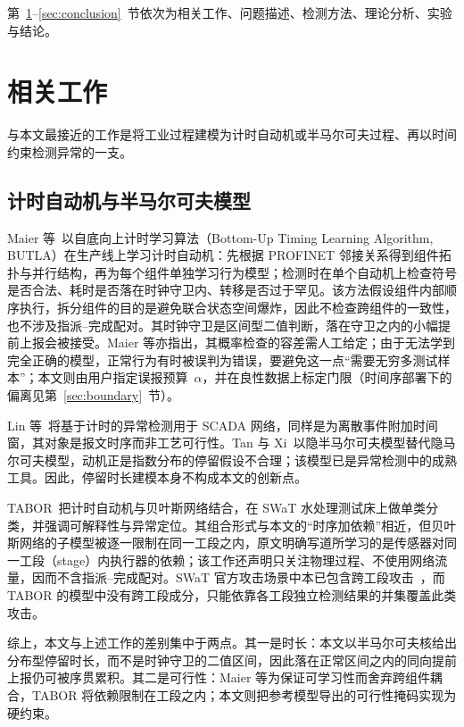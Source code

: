 \documentclass[manuscript,screen,review]{acmart}
\begin{document}
第~\ref{sec:related}--\ref{sec:conclusion}~节依次为相关工作、问题描述、检测方法、理论分析、实验与结论。

\section{相关工作}
\label{sec:related}

与本文最接近的工作是将工业过程建模为计时自动机或半马尔可夫过程、再以时间约束检测异常的一支。

\subsection{计时自动机与半马尔可夫模型}
\label{sec:rw_timed}

Maier 等~\cite{maier2011timed}以自底向上计时学习算法（Bottom-Up Timing Learning Algorithm, {BUTLA}）在生产线上学习计时自动机：先根据 {PROFINET} 邻接关系得到组件拓扑与并行结构，再为每个组件单独学习行为模型；检测时在单个自动机上检查符号是否合法、耗时是否落在时钟守卫内、转移是否过于罕见。该方法假设组件内部顺序执行，拆分组件的目的是避免联合状态空间爆炸，因此不检查跨组件的一致性，也不涉及指派--完成配对。其时钟守卫是区间型二值判断，落在守卫之内的小幅提前上报会被接受。Maier 等亦指出，其概率检查的容差需人工给定；由于无法学到完全正确的模型，正常行为有时被误判为错误，要避免这一点``需要无穷多测试样本''；本文则由用户指定误报预算~$\alpha$，并在良性数据上标定门限（时间序部署下的偏离见第~\ref{sec:boundary}~节）。

Lin 等~\cite{lin2018timing}将基于计时的异常检测用于 {SCADA} 网络，同样是为离散事件附加时间窗，其对象是报文时序而非工艺可行性。Tan 与 Xi~\cite{tan2008hsmm}以隐半马尔可夫模型替代隐马尔可夫模型，动机正是指数分布的停留假设不合理；该模型已是异常检测中的成熟工具。因此，停留时长建模本身不构成本文的创新点。

TABOR~\cite{lin2018tabor}把计时自动机与贝叶斯网络结合，在 {SWaT} 水处理测试床上做单类分类，并强调可解释性与异常定位。其组合形式与本文的``时序加依赖''相近，但贝叶斯网络的子模型被逐一限制在同一工段之内，原文明确写道所学习的是传感器对同一工段（stage）内执行器的依赖；该工作还声明只关注物理过程、不使用网络流量，因而不含指派--完成配对。{SWaT} 官方攻击场景中本已包含跨工段攻击~\cite{goh2016swat,lin2018tabor}，而 TABOR 的模型中没有跨工段成分，只能依靠各工段独立检测结果的并集覆盖此类攻击。

综上，本文与上述工作的差别集中于两点。其一是时长：本文以半马尔可夫核给出分布型停留时长，而不是时钟守卫的二值区间，因此落在正常区间之内的同向提前上报仍可被序贯累积。其二是可行性：Maier 等为保证可学习性而舍弃跨组件耦合，TABOR 将依赖限制在工段之内；本文则把参考模型导出的可行性掩码实现为硬约束。
\end{document}
